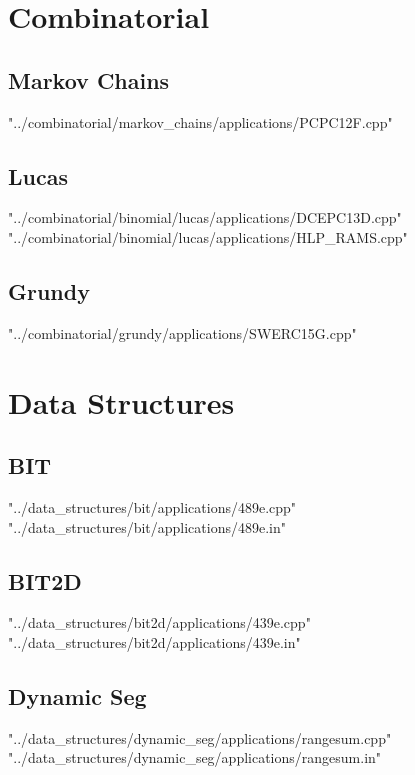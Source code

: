 \documentclass [12pt,onecolumn,oneside]{article}
\begin{document}
\pagestyle{fancy}
\fancyfoot{}
\fancyhead[R]{\thepage}
\renewcommand{\headrulewidth}{0.4pt}
\tableofcontents
\scriptsize

\bigskip
\section{Combinatorial}
\subsection{ Markov Chains}
 {"../combinatorial/markov_chains/applications/PCPC12F.cpp"}
\newpage

\subsection{ Lucas}
 {"../combinatorial/binomial/lucas/applications/DCEPC13D.cpp"}
\newpage
 {"../combinatorial/binomial/lucas/applications/HLP_RAMS.cpp"}
\newpage

\subsection{ Grundy}
 {"../combinatorial/grundy/applications/SWERC15G.cpp"}
\newpage

\section{Data Structures}
\subsection{ BIT}
 {"../data_structures/bit/applications/489e.cpp"}
 {"../data_structures/bit/applications/489e.in"}
\newpage

\subsection{ BIT2D}
 {"../data_structures/bit2d/applications/439e.cpp"}
 {"../data_structures/bit2d/applications/439e.in"}
\newpage

\subsection{ Dynamic Seg}
 {"../data_structures/dynamic_seg/applications/rangesum.cpp"}
 {"../data_structures/dynamic_seg/applications/rangesum.in"}
\newpage
\end{document}
